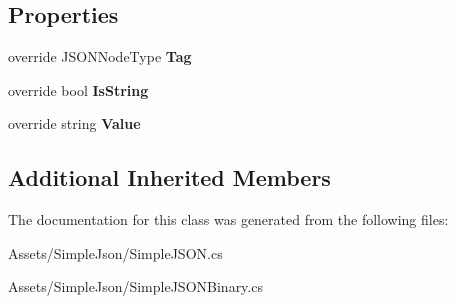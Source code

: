 \subsection*{Properties}
\begin{DoxyCompactItemize}
\item 
override J\+S\+O\+N\+Node\+Type {\bfseries Tag}\hypertarget{classSimpleJSON_1_1JSONString_ac09045c464da9c25c2f2b0a2b87ef126}{}\label{classSimpleJSON_1_1JSONString_ac09045c464da9c25c2f2b0a2b87ef126}

\item 
override bool {\bfseries Is\+String}\hypertarget{classSimpleJSON_1_1JSONString_a742375d29619fea9517daa72c966dc26}{}\label{classSimpleJSON_1_1JSONString_a742375d29619fea9517daa72c966dc26}

\item 
override string {\bfseries Value}\hypertarget{classSimpleJSON_1_1JSONString_abdb3a654f54387390505b3246982100c}{}\label{classSimpleJSON_1_1JSONString_abdb3a654f54387390505b3246982100c}

\end{DoxyCompactItemize}
\subsection*{Additional Inherited Members}


The documentation for this class was generated from the following files\+:\begin{DoxyCompactItemize}
\item 
Assets/\+Simple\+Json/Simple\+J\+S\+O\+N.\+cs\item 
Assets/\+Simple\+Json/Simple\+J\+S\+O\+N\+Binary.\+cs\end{DoxyCompactItemize}
